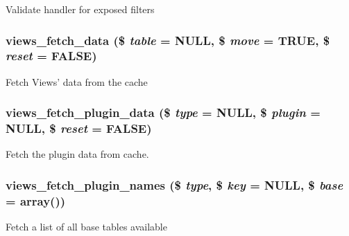 \label{views_8module_aabe2634331d3b98e6f229d3392d2b5ce}
Validate handler for exposed filters \hypertarget{views_8module_ae5d88e70640d423f3faed5c7bb6af672}{
\subsubsection[{views\_\-fetch\_\-data}]{\setlength{\rightskip}{0pt plus 5cm}views\_\-fetch\_\-data (\$ {\em table} = {\ttfamily NULL}, \/  \$ {\em move} = {\ttfamily TRUE}, \/  \$ {\em reset} = {\ttfamily FALSE})}}
\label{views_8module_ae5d88e70640d423f3faed5c7bb6af672}
Fetch Views' data from the cache \hypertarget{views_8module_ae97ae3a47ea45a0d7d39a52286e6fab2}{
\subsubsection[{views\_\-fetch\_\-plugin\_\-data}]{\setlength{\rightskip}{0pt plus 5cm}views\_\-fetch\_\-plugin\_\-data (\$ {\em type} = {\ttfamily NULL}, \/  \$ {\em plugin} = {\ttfamily NULL}, \/  \$ {\em reset} = {\ttfamily FALSE})}}
\label{views_8module_ae97ae3a47ea45a0d7d39a52286e6fab2}
Fetch the plugin data from cache. \hypertarget{views_8module_ae7963b102753500f8de139bf60d59ca5}{
\subsubsection[{views\_\-fetch\_\-plugin\_\-names}]{\setlength{\rightskip}{0pt plus 5cm}views\_\-fetch\_\-plugin\_\-names (\$ {\em type}, \/  \$ {\em key} = {\ttfamily NULL}, \/  \$ {\em base} = {\ttfamily array()})}}
\label{views_8module_ae7963b102753500f8de139bf60d59ca5}
Fetch a list of all base tables available


